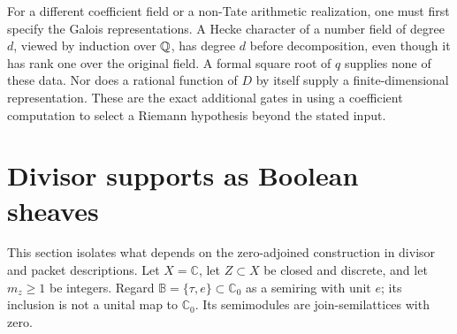 \documentclass[11pt]{article}
\newcommand{\C}{\mathbb C}\newcommand{\B}{\mathbb B}
\theoremstyle{definition}\newtheorem{definition}[theorem]{Definition}
\begin{document}
For a different coefficient field or a non-Tate arithmetic realization, one must first specify the Galois representations. A Hecke character of a number field of degree $d$, viewed by induction over $\mathbb Q$, has degree $d$ before decomposition, even though it has rank one over the original field. A formal square root of $q$ supplies none of these data. Nor does a rational function of $D$ by itself supply a finite-dimensional representation. These are the exact additional gates in using a coefficient computation to select a Riemann hypothesis beyond the stated input.



\section{Divisor supports as Boolean sheaves}\label{sec:sheaves}
This section isolates what depends on the zero-adjoined construction in divisor and packet descriptions. Let $X=\C$, let $Z\subset X$ be closed and discrete, and let $m_z\ge1$ be integers. Regard $\B=\{\tau,e\}\subset\C_0$ as a semiring with unit $e$; its inclusion is not a unital map to $\C_0$. Its semimodules are join-semilattices with zero.
\end{document}
